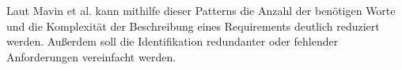 Laut Mavin et al. kann mithilfe dieser Patterns die Anzahl der benötigen Worte und die Komplexität der Beschreibung eines Requirements deutlich reduziert werden. Außerdem soll die Identifikation redundanter oder fehlender Anforderungen vereinfacht werden.\\

